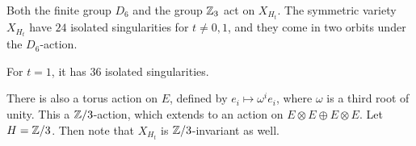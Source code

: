 \begin{proposition}
Both the finite group $D_6$ and the group $\mathbb{Z}_3$ act on $X_{H_t}$. The symmetric variety $X_{H_t}$ have $24$ isolated singularities for $t \neq 0,1$, and they come in two orbits under the $D_6$-action.

For $t=1$, it has $36$ isolated singularities.
\end{proposition}

There is also a torus action on $E$, defined by $e_i \mapsto \omega^i e_i$, where $\omega$ is a third root of unity. This a $\mathbb{Z}/3$-action, which extends to an action on $ E\otimes E \oplus E \otimes E$. Let $H=\mathbb{Z}/3$. Then note that $X_{H_t}$ is $\mathbb{Z}/3$-invariant as well. 

